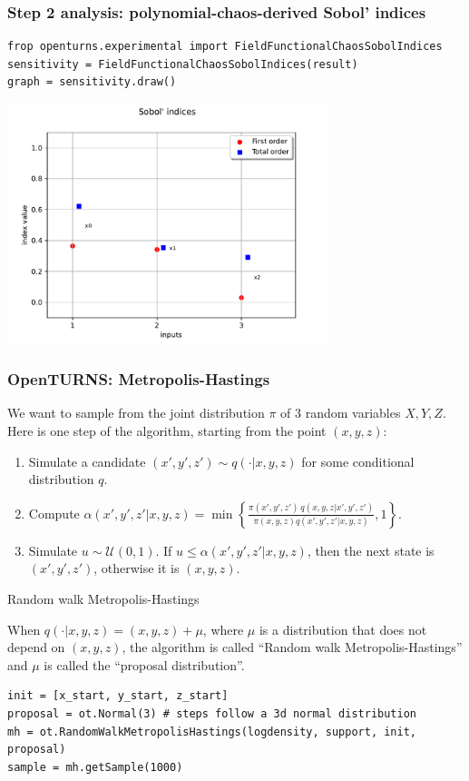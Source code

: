 \documentclass{beamer}
\begin{document}
\begin{frame}[containsverbatim]
\frametitle{Step 2 analysis: polynomial-chaos-derived Sobol' indices}

\begin{lstlisting}
frop openturns.experimental import FieldFunctionalChaosSobolIndices
sensitivity = FieldFunctionalChaosSobolIndices(result)
graph = sensitivity.draw()
\end{lstlisting}

\centering
\includegraphics[width=0.7\textwidth]{figures/sobol.pdf}

\end{frame}
  

\begin{frame}[containsverbatim]
\frametitle{OpenTURNS: Metropolis-Hastings}
\small
We want to sample from the joint distribution $\pi$ of 3 random variables $X, Y, Z$.
Here is one step of the algorithm, starting from the point $(x, y, z)$:

\begin{enumerate}
\item Simulate a candidate $(x',y',z') \sim q( \cdot | x, y, z)$ for some conditional distribution $q$.
\item Compute
$
\alpha(x',y',z' | x,y,z) = \min \left\{ \frac{\pi(x',y',z') \, q(x,y,z | x',y',z')}{\pi(x,y,z) q(x',y',z' | x,y,z)} , 1 \right\}.
$
\item Simulate $u \sim \mathcal{U}(0,1)$. If $u \leqslant \alpha(x',y',z' | x,y,z)$,
then the next state is $(x',y',z')$, otherwise it is $(x,y,z)$.
\end{enumerate}

\begin{block}{Random walk Metropolis-Hastings}

When $q(\cdot | x, y, z) = (x,y,z) + \mu$, where $\mu$ is a distribution that does not depend on $(x,y,z)$,
the  algorithm is called ``Random walk Metropolis-Hastings'' and $\mu$ is called the ``proposal distribution''.

\begin{lstlisting}
init = [x_start, y_start, z_start]
proposal = ot.Normal(3) # steps follow a 3d normal distribution
mh = ot.RandomWalkMetropolisHastings(logdensity, support, init, proposal)
sample = mh.getSample(1000)
\end{lstlisting}
\end{block}

\end{frame}
\end{document}

